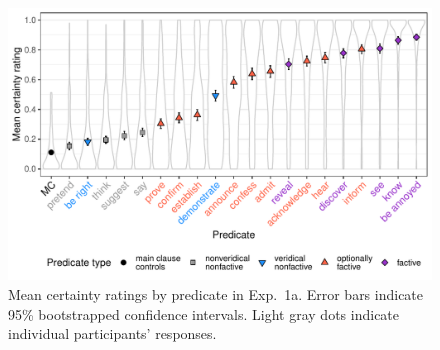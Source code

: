 \documentclass{language}
\newcommand{\6}{\mbox{$[\hspace*{-.6mm}[$}}
\newcommand{\9}{\mbox{$]\hspace*{-.6mm}]$}}
\begin{document}
\begin{figure}[H]
\centering

\includegraphics[width=.7\paperwidth]{Language-figures/color/Figure2}

\caption{Mean certainty ratings by predicate in Exp.~1a. Error bars indicate 95\% bootstrapped confidence intervals. Light gray dots indicate individual participants' responses.} 
\label{f-projectivity}
\end{figure}




\end{document}
